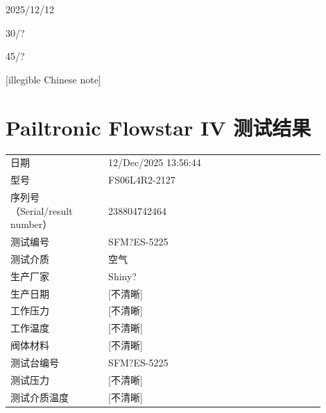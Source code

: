 \documentclass[UTF8,10pt,a4paper,fontset=fandol]{ctexart}
\newcommand{\fieldvalue}[1]{#1}
\newcommand{\handwritten}[1]{#1}
\begin{document}
\handwritten{2025/12/12}

\handwritten{30/?}

\handwritten{45/?}

\handwritten{[illegible Chinese note]}

\newpage

\section{Pailtronic Flowstar IV 测试结果}

\begin{tabular}{@{}p{0.28\linewidth}p{0.62\linewidth}@{}}
日期 &
\fieldvalue{12/Dec/2025 13:56:44}
\\
型号 &
\fieldvalue{FS06L4R2-2127}
\\
序列号（Serial/result number） &
\fieldvalue{238804742464}
\\
测试编号 &
\fieldvalue{SFM?ES-5225}
\\
测试介质 &
\fieldvalue{空气}
\\
生产厂家 &
\fieldvalue{Shiny?}
\\
生产日期 &
\fieldvalue{[不清晰]}
\\
工作压力 &
\fieldvalue{[不清晰]}
\\
工作温度 &
\fieldvalue{[不清晰]}
\\
阀体材料 &
\fieldvalue{[不清晰]}
\\
测试台编号 &
\fieldvalue{SFM?ES-5225}
\\
测试压力 &
\fieldvalue{[不清晰]}
\\
测试介质温度 &
\fieldvalue{[不清晰]}
\end{tabular}
\end{document}
